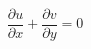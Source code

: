 \documentclass[french]{article}
\begin{document}
\begin{equation}
\label{Eq:1}
\frac{\partial u}{\partial x} + \frac{\partial v}{\partial y} = 0
\end{equation}
%
\end{document}
